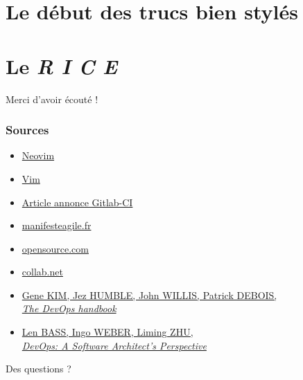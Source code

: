 \documentclass[10pt]{beamer}
\begin{document}
		\section{Le début des trucs bien stylés}
		\section{Le \textit{R I C E}}

	\begin{appendix}

		\begin{frame}[standout]
			Merci d'avoir écouté !
		\end{frame}

		\begin{frame}
			\frametitle{Sources}
			\begin{itemize}
				\item \href{https://neovim.io/}{Neovim}
				\item \href{https://www.vim.org}{Vim}

				\item \href{https://about.gitlab.com/press/releases/2018-03-22-gitlab-cicd-github-integration.html}{Article annonce Gitlab-CI}
				\item \href{http://manifesteagile.fr/}{manifesteagile.fr}
				\item \href{https://opensource.com/article/17/11/5-keys-get-started-devops}{opensource.com}
				\item \href{https://resources.collab.net/devops-101/what-is-devops}{collab.net}

				\item \href{https://itrevolution.com/book/the-devops-handbook/}{Gene KIM, Jez HUMBLE, John WILLIS, Patrick DEBOIS,\\ \textit{The DevOps handbook}}
				\item \href{https://itrevolution.com/book/the-devops-handbook/}{Len BASS, Ingo WEBER, Liming ZHU,\\ \textit{DevOps: A Software Architect’s Perspective}}
			\end{itemize}
		\end{frame}

		\begin{frame}[standout]
			Des questions ?
		\end{frame}

	\end{appendix}
\end{document}
